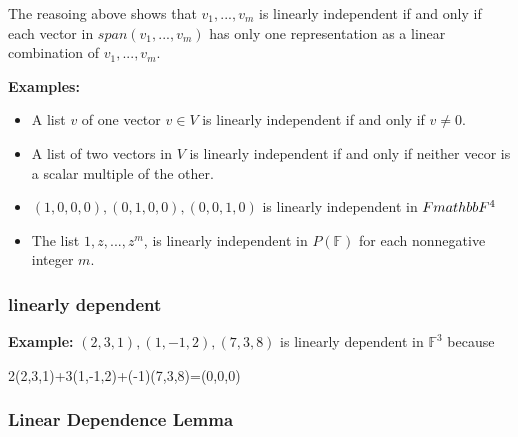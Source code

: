 \documentclass{report}
\begin{document}
The reasoing above shows that $v_1,...,v_m$ is linearly independent if and only if each vector in $span(v_1,...,v_m)$ has only one representation as a linear combination of $v_1,...,v_m$.

\textbf{Examples:}\newline
\begin{itemize}
    \item A list $v$ of one vector $v \in V$ is linearly independent if and only if $v \neq 0$.
    \item A list of two vectors in $V$ is linearly independent if and only if neither vecor is a scalar multiple of the other.
    \item $(1,0,0,0),(0,1,0,0),(0,0,1,0)$ is linearly independent in $F\\mathbb{F}^4$
    \item The list $1,z,...,z^m$, is linearly independent in $P(\mathbb{F})$ for each nonnegative integer $m$.
\end{itemize}

\subsubsection{linearly dependent}


\textbf{Example: }\newline
$(2,3,1), (1,-1,2), (7,3,8)$ is linearly dependent in $\mathbb{F}^3$ because\newline
\centerline{2(2,3,1)+3(1,-1,2)+(-1)(7,3,8)=(0,0,0)}

\subsubsection{Linear Dependence Lemma}
\end{document}
